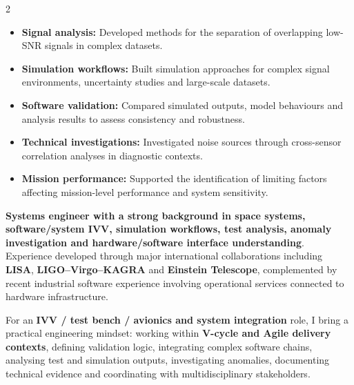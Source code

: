\documentclass[8pt,a4paper,ragged2e,withhyper]{altacv}
\begin{document}
\begin{paracol}{2}
\begin{itemize}
  \item \textbf{Signal analysis:} Developed methods for the separation of overlapping low-SNR signals in complex datasets.
  \item \textbf{Simulation workflows:} Built simulation approaches for complex signal environments, uncertainty studies and large-scale datasets.
  \item \textbf{Software validation:} Compared simulated outputs, model behaviours and analysis results to assess consistency and robustness.
  \item \textbf{Technical investigations:} Investigated noise sources through cross-sensor correlation analyses in diagnostic contexts.
  \item \textbf{Mission performance:} Supported the identification of limiting factors affecting mission-level performance and system sensitivity.
\end{itemize}

\switchcolumn


\textbf{Systems engineer with a strong background in space systems, software/system IVV, simulation workflows, test analysis, anomaly investigation and hardware/software interface understanding}. Experience developed through major international collaborations including \textbf{LISA}, \textbf{LIGO--Virgo--KAGRA} and \textbf{Einstein Telescope}, complemented by recent industrial software experience involving operational services connected to hardware infrastructure.

For an \textbf{IVV / test bench / avionics and system integration} role, I bring a practical engineering mindset: working within \textbf{V-cycle and Agile delivery contexts}, defining validation logic, integrating complex software chains, analysing test and simulation outputs, investigating anomalies, documenting technical evidence and coordinating with multidisciplinary stakeholders.


\end{paracol}
\end{document}
